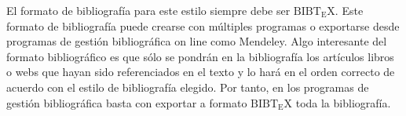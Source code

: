 El formato de bibliografía para este estilo siempre debe ser $\mathrm{B{\scriptstyle{IB}} \! T\!_{\displaystyle E} \! X}$. Este formato de bibliografía puede crearse con múltiples programas o exportarse desde programas de gestión bibliográfica on line como Mendeley. Algo interesante del formato bibliográfico es que sólo se pondrán en la bibliografía los artículos libros o webs que hayan sido referenciados en el texto y lo hará en el orden correcto de acuerdo con el estilo de bibliografía elegido. Por tanto, en los programas de gestión bibliográfica basta con exportar a formato $\mathrm{B{\scriptstyle{IB}} \! T\!_{\displaystyle E} \! X}$ toda la bibliografía.
